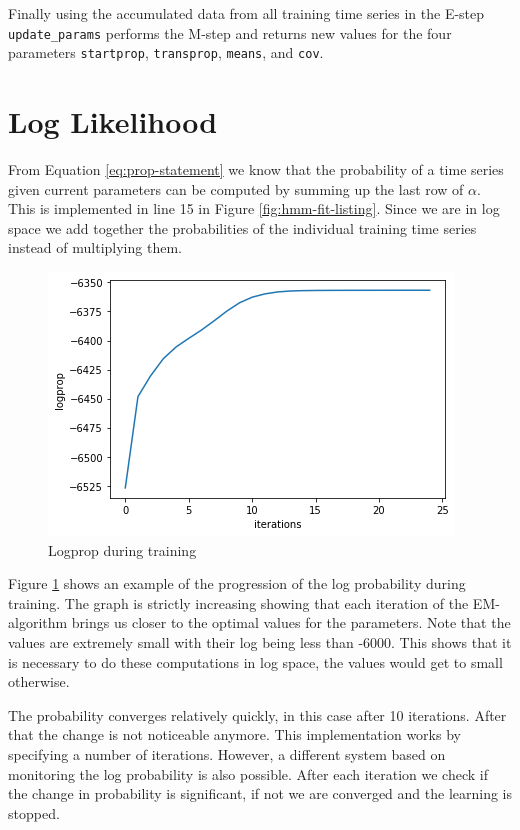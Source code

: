 Finally using the accumulated data from all training time series in the E-step \texttt{update\_params} performs the M-step and returns new values for the four parameters \texttt{startprop}, \texttt{transprop}, \texttt{means}, and \texttt{cov}.

\section{Log Likelihood}

From Equation \eqref{eq:prop-statement} we know that the probability of a time series given current parameters can be computed by summing up the last row of $\alpha$. This is implemented in line 15 in Figure \ref{fig:hmm-fit-listing}. Since we are in log space we add together the probabilities of the individual training time series instead of multiplying them.

\begin{figure}
   \includegraphics{figures/logprop.png}
   \caption{Logprop during training}
      
   \label{fig:lopprop-graph}
\end{figure}

Figure \ref{fig:lopprop-graph} shows an example of the progression of the log probability during training. The graph is strictly increasing showing that each iteration of the EM-algorithm brings us closer to the optimal values for the parameters. Note that the values are extremely small with their log being less than -6000. This shows that it is necessary to do these computations in log space, the values would get to small otherwise. 

The probability converges relatively quickly, in this case after 10 iterations. After that the change is not noticeable anymore. This implementation works by specifying a number of iterations. However, a different system based on monitoring the log probability is also possible. After each iteration we check if the change in probability is significant, if not we are converged and the learning is stopped.


